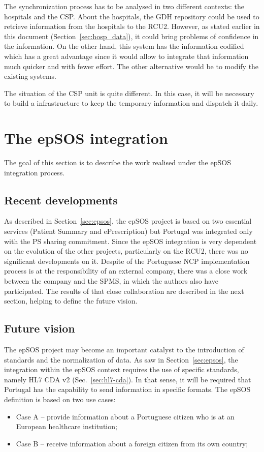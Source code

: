 The synchronization process has to be analysed in two different contexts: the hospitals and the CSP. About the hospitals, the GDH repository could be used to retrieve information from the hospitals to the RCU2. However, as stated earlier in this document (Section~\ref{sec:hosp_data}), it could bring problems of confidence in the information. On the other hand, this system has the information codified which has a great advantage since it would allow to integrate that information much quicker and with fewer effort. The other alternative would be to modify the existing systems.

The situation of the CSP unit is quite different. In this case, it will be necessary to build a infrastructure to keep the temporary information and dispatch it daily.



\section{The epSOS integration}

The goal of this section is to describe the work realised under the epSOS integration process.

\subsection{Recent developments}

As described in Section~\ref{sec:epsos}, the epSOS project is based on two essential services (Patient Summary and ePrescription) but Portugal was integrated only with the PS sharing commitment. Since the epSOS integration is very dependent on the evolution of the other projects, particularly on the RCU2, there was no significant developments on it. Despite of the Portuguese NCP implementation process is at the responsibility of an external company, there was a close work between the company and the SPMS, in which the authors also have participated. The results of that close collaboration are described in the next section, helping to define the future vision.

\subsection{Future vision}

The epSOS project may become an important catalyst to the introduction of standards and the normalization of data. As saw in Section~\ref{sec:epsos}, the integration within the epSOS context requires the use of specific standards, namely HL7 CDA v2 (Sec.~\ref{sec:hl7-cda}). In that sense, it will be required that Portugal has the capability to send information in specific formats. The epSOS definition is based on two use cases:
\begin{itemize}
\item Case A -- provide information about a Portuguese citizen who is at an European healthcare institution;
\item Case B -- receive information about a foreign citizen from its own country;
\end{itemize}


